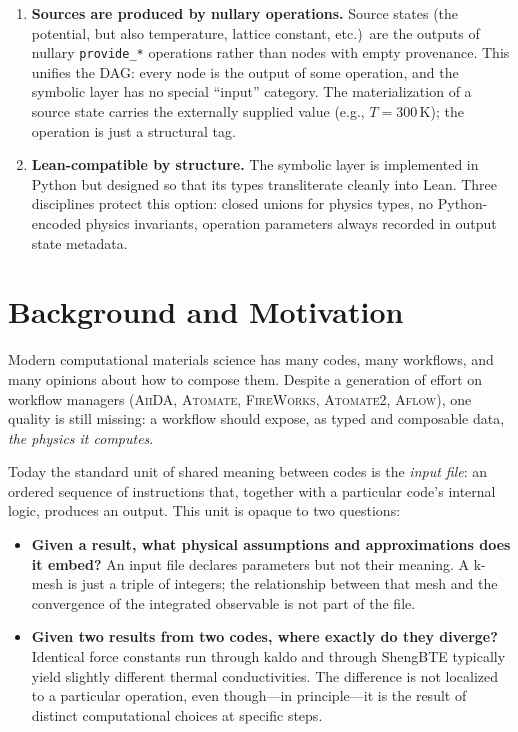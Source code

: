 \documentclass[11pt,a4paper]{article}
\begin{document}
\begin{enumerate}[leftmargin=2.5em, itemsep=0.4em]
  \item \textbf{Sources are produced by nullary operations.} Source states (the
        potential, but also temperature, lattice constant, etc.)\ are the outputs of
        nullary \texttt{provide\_*} operations rather than nodes with empty provenance.
        This unifies the DAG: every node is the output of some operation, and the
        symbolic layer has no special ``input'' category. The materialization of a source
        state carries the externally supplied value (e.g., $T = 300\,\mathrm{K}$); the
        operation is just a structural tag.

  \item \textbf{Lean-compatible by structure.} The symbolic layer is implemented in Python
        but designed so that its types transliterate cleanly into Lean. Three disciplines
        protect this option: closed unions for physics types, no Python-encoded physics
        invariants, operation parameters always recorded in output state metadata.
       
\end{enumerate}

\bigskip


\section{Background and Motivation}
\label{sec:motivation}

Modern computational materials science has many codes, many workflows, and many opinions about how
to compose them. Despite a generation of effort on workflow managers (\textsc{AiiDA}, \textsc{Atomate},
\textsc{FireWorks}, \textsc{Atomate2}, \textsc{Aflow}), one quality is still missing: a workflow
should expose, as typed and composable data, \emph{the physics it computes}.

Today the standard unit of shared meaning between codes is the \emph{input file}: an ordered
sequence of instructions that, together with a particular code's internal logic, produces an
output. This unit is opaque to two questions:

\begin{itemize}[leftmargin=2em]
  \item \textbf{Given a result, what physical assumptions and approximations does it embed?}
        An input file declares parameters but not their meaning. A k-mesh is just a triple of
        integers; the relationship between that mesh and the convergence of the integrated
        observable is not part of the file.
  \item \textbf{Given two results from two codes, where exactly do they diverge?} Identical force
        constants run through kaldo and through ShengBTE typically yield slightly different
        thermal conductivities. The difference is not localized to a particular operation, even
        though---in principle---it is the result of distinct computational choices at specific
        steps.
\end{itemize}
\end{document}
